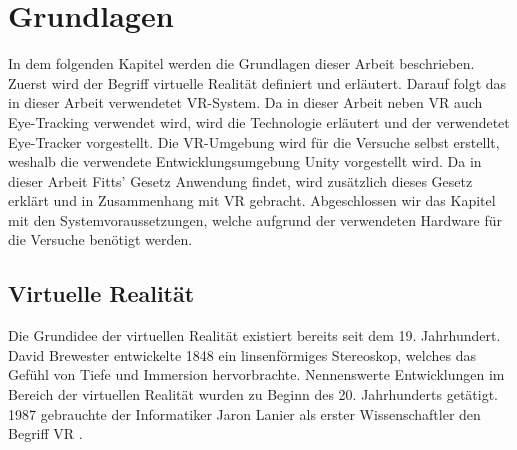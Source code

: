 
\chapter{Grundlagen}
In dem folgenden Kapitel werden die Grundlagen dieser Arbeit beschrieben. Zuerst wird der Begriff virtuelle Realität definiert und erläutert. Darauf folgt das in dieser Arbeit verwendetet \ac{VR}-System. Da in dieser Arbeit neben \ac{VR} auch Eye-Tracking verwendet wird, wird die Technologie erläutert und der verwendetet Eye-Tracker vorgestellt. Die \ac{VR}-Umgebung wird für die Versuche selbst erstellt, weshalb die verwendete Entwicklungsumgebung Unity vorgestellt wird. Da in dieser Arbeit Fitts' Gesetz Anwendung findet, wird zusätzlich dieses Gesetz erklärt und in Zusammenhang mit \ac{VR} gebracht. Abgeschlossen wir das Kapitel mit den Systemvoraussetzungen, welche aufgrund der verwendeten Hardware für die Versuche benötigt werden.

\section{Virtuelle Realität}
Die Grundidee der virtuellen Realität existiert bereits seit dem 19. Jahrhundert. David Brewester entwickelte 1848 ein linsenförmiges Stereoskop, welches das Gefühl von Tiefe und Immersion hervorbrachte. Nennenswerte Entwicklungen im Bereich der virtuellen Realität wurden zu Beginn des 20. Jahrhunderts getätigt. \cite{Singh.2017} 1987 gebrauchte der Informatiker Jaron Lanier als erster Wissenschaftler den Begriff \ac{VR} \cite{Doerner2019}. 

